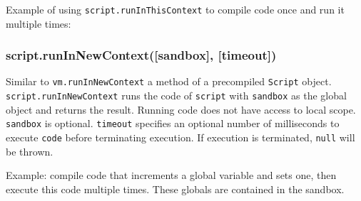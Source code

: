 Example of using \texttt{script.runInThisContext} to compile code once
and run it multiple times:

\begin{Shaded}
\begin{Highlighting}[]
 \NormalTok{);}

\NormalTok{;}

 \NormalTok{(}\NormalTok{, }\NormalTok{);}

 \NormalTok{(}  \NormalTok{) \{}
  \NormalTok{();}
\NormalTok{\}}


\end{Highlighting}
\end{Shaded}

\subsubsection{script.runInNewContext({[}sandbox{]}, {[}timeout{]})}

Similar to \texttt{vm.runInNewContext} a method of a precompiled
\texttt{Script} object. \texttt{script.runInNewContext} runs the code of
\texttt{script} with \texttt{sandbox} as the global object and returns
the result. Running code does not have access to local scope.
\texttt{sandbox} is optional. \texttt{timeout} specifies an optional
number of milliseconds to execute \texttt{code} before terminating
execution. If execution is terminated, \texttt{null} will be thrown.

Example: compile code that increments a global variable and sets one,
then execute this code multiple times. These globals are contained in
the sandbox.


